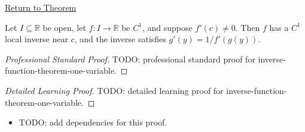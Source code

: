 \newpage
{}
\label{prf:inverse-function-theorem-one-variable}

\begin{remark*}[Return]
\hyperref[thm:inverse-function-theorem-one-variable]{Return to Theorem}
\end{remark*}

\begin{theorem*}
Let \(I\subseteq\mathbb{R}\) be open, let \(f:I\to\mathbb{R}\) be \(C^1\), and suppose \(f'(c)\neq 0\). Then \(f\) has a \(C^1\) local inverse near \(c\), and the inverse satisfies \(g'(y)=1/f'(g(y))\).
\end{theorem*}

\begin{proof}[Professional Standard Proof]
\LRAProofBodyStart
TODO: professional standard proof for inverse-function-theorem-one-variable.
\end{proof}

\begin{proof}[Detailed Learning Proof]
\LRAProofBodyStart
TODO: detailed learning proof for inverse-function-theorem-one-variable.
\end{proof}

\begin{remark*}
\end{remark*}

\begin{dependencies}
\begin{itemize}
  \item TODO: add dependencies for this proof.
\end{itemize}
\end{dependencies}

\clearpage
